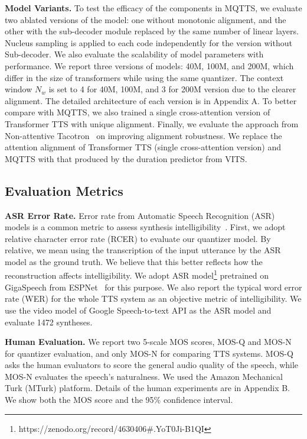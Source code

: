 \documentclass[letterpaper]{article} %
\begin{document}
\textbf{Model Variants.}
To test the efficacy of the components in MQTTS, we evaluate two ablated versions of the model: one without monotonic alignment, and the other with the sub-decoder module replaced by the same number of linear layers.
Nucleus sampling is applied to each code independently for the version without Sub-decoder.
We also evaluate the scalability of model parameters with performance.
We report three versions of models: 40M, 100M, and 200M, which differ in the size of transformers while using the same quantizer.
The context window $N_w$ is set to 4 for 40M, 100M, and 3 for 200M version due to the clearer alignment.
The detailed architecture of each version is in Appendix A.
To better compare with MQTTS, we also trained a single cross-attention version of Transformer TTS with unique alignment.
Finally, we evaluate the approach from Non-attentive Tacotron~\cite{DBLP:journals/corr/abs-2010-04301} on improving alignment robustness.
We replace the attention alignment of Transformer TTS (single cross-attention version) and MQTTS with that produced by the duration predictor from VITS.

\subsection{Evaluation Metrics}

\textbf{ASR Error Rate.}
Error rate from Automatic Speech Recognition (ASR) models is a common metric to assess synthesis intelligibility~\cite{DBLP:conf/icassp/HayashiYIY0TTZT20}.
First, we adopt relative character error rate (RCER) to evaluate our quantizer model.
By relative, we mean using the transcription of the input utterance by the ASR model as the ground truth.
We believe that this better reflects how the reconstruction affects intelligibility.
We adopt ASR model\footnote{https://zenodo.org/record/4630406\#.YoT0Ji-B1QI} pretrained on GigaSpeech from ESPNet~\cite{watanabe2018espnet} for this purpose.
We also report the typical word error rate (WER) for the whole TTS system as an objective metric of intelligibility.
We use the video model of Google Speech-to-text API as the ASR model and evaluate 1472 syntheses.

\textbf{Human Evaluation.}
We report two 5-scale MOS scores, MOS-Q and MOS-N for quantizer evaluation, and only MOS-N for comparing TTS systems.
MOS-Q asks the human evaluators to score the general audio quality of the speech, while MOS-N evaluates the speech's naturalness.
We used the Amazon Mechanical Turk (MTurk) platform.
Details of the human experiments are in Appendix B.
We show both the MOS score and the 95\% confidence interval.
\end{document}
